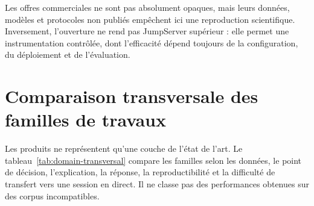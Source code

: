 \documentclass[11pt,a4paper,oneside]{report}
\theoremstyle{definition}
\theoremstyle{plain}
\begin{document}
Les offres commerciales ne sont pas absolument opaques, mais leurs données, modèles et protocoles non publiés empêchent ici une reproduction scientifique. Inversement, l'ouverture ne rend pas JumpServer supérieur : elle permet une instrumentation contrôlée, dont l'efficacité dépend toujours de la configuration, du déploiement et de l'évaluation.

\section{Comparaison transversale des familles de travaux}
\label{sec:domain-transversal}

Les produits ne représentent qu'une couche de l'état de l'art. Le tableau~\ref{tab:domain-transversal} compare les familles selon les données, le point de décision, l'explication, la réponse, la reproductibilité et la difficulté de transfert vers une session en direct. Il ne classe pas des performances obtenues sur des corpus incompatibles.
\end{document}

